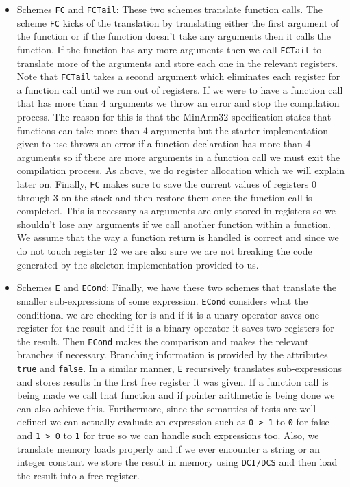 \documentclass{article}
\begin{document}
\begin{itemize}
  \item Schemes \texttt{FC} and \texttt{FCTail}: These two schemes translate function calls. The scheme \texttt{FC} kicks of the translation by translating either the first argument of the function or if the function doesn't take any arguments then it calls the function. If the function has any more arguments then we call \texttt{FCTail} to translate more of the arguments and store each one in the relevant registers. Note that \texttt{FCTail} takes a second argument which eliminates each register for a function call until we run out of registers. If we were to have a function call that has more than $4$ arguments we throw an error and stop the compilation process. The reason for this is that the MinArm32 specification states that functions can take more than $4$ arguments but the starter implementation given to use throws an error if a function declaration has more than $4$ arguments so if there are more arguments in a function call we must exit the compilation process. As above, we do register allocation which we will explain later on. Finally, \texttt{FC} makes sure to save the current values of registers $0$ through $3$ on the stack and then restore them once the function call is completed. This is necessary as arguments are only stored in registers so we shouldn't lose any arguments if we call another function within a function. We assume that the way a function return is handled is correct and since we do not touch register $12$ we are also sure we are not breaking the code generated by the skeleton implementation provided to us.
  \item Schemes \texttt{E} and \texttt{ECond}: Finally, we have these two schemes that translate the smaller sub-expressions of some expression. \texttt{ECond} considers what the conditional we are checking for is and if it is a unary operator saves one register for the result and if it is a binary operator it saves two registers for the result. Then \texttt{ECond} makes the comparison and makes the relevant branches if necessary. Branching information is provided by the attributes \texttt{true} and \texttt{false}. In a similar manner, \texttt{E} recursively translates sub-expressions and stores results in the first free register it was given. If a function call is being made we call that function and if pointer arithmetic is being done we can also achieve this. Furthermore, since the semantics of tests are well-defined we can actually evaluate an expression such as \texttt{0 > 1} to \texttt{0} for false and \texttt{1 > 0} to \texttt{1} for true so we can handle such expressions too. Also, we translate memory loads properly and if we ever encounter a string or an integer constant we store the result in memory using \texttt{DCI/DCS} and then load the result into a free register. 
\end{itemize}
\end{document}
